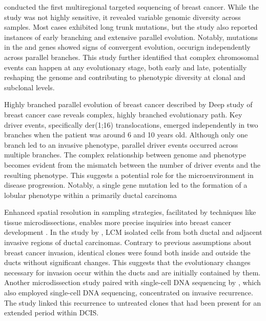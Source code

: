 \textcite{Yates2015-xk} conducted the first multiregional targeted sequencing of breast cancer. While the study was not highly sensitive, it revealed variable genomic diversity across samples. Most cases exhibited long trunk mutations, but the study also reported instances of early branching and extensive parallel evolution. Notably, mutations in the  and  genes showed signs of convergent evolution, occurign independently across parallel branches. This study further identified that complex chromosomal events can happen at any evolutionary stage, both early and late, potentially reshaping the genome and contributing to phenotypic diversity at clonal and subclonal levels.

{Highly branched parallel evolution of breast cancer described by \textcite{Nishimura2023-mk}}
{Deep study of breast cancer case reveals complex, highly branched evolutionary path. Key driver events, specifically der(1;16) translocations, emerged independently in two branches when the patient was around 6 and 10 years old. Although only one branch led to an invasive phenotype, parallel driver events occurred across multiple branches. The complex relationship between genome and phenotype becomes evident from the mismatch between the number of driver events and the resulting phenotype. This suggests a potential role for the microenvironment in disease progression. Notably, a single  gene mutation led to the formation of a lobular phenotype within a primarily ductal carcinoma}

Enhanced spatial resolution in sampling strategies, facilitated by techniques like tissue microdissections, enables more precise inquiries into breast cancer development . In the study by \textcite{Casasent2018-gx}, \ac{LCM} isolated cells from both ductal and adjacent invasive regions of ductal carcinomas. Contrary to previous assumptions about breast cancer invasion, identical clones were found both inside and outside the ducts without significant changes. This suggests that the evolutionary changes necessary for invasion occur within the ducts and are initially contained by them. Another microdissection study paired with single-cell DNA sequencing by \textcite{Lips2022-kv}, which also employed single-cell DNA sequencing, concentrated on invasive recurrence. The study linked this recurrence to untreated clones that had been present for an extended period within \ac{DCIS}.

